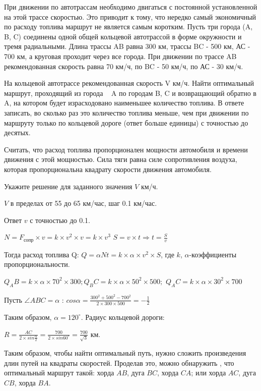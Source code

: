 
При движении по автотрассам необходимо двигаться с постоянной
установленной на этой трассе скоростью. Это приводит к тому, что нередко самый
экономичный по расходу топлива маршрут не является самым коротким.  Пусть три города (A, B, C) соединены одной общей кольцевой
автотрассой в форме окружности и тремя радиальными.  Длина трассы AB
равна 300 км, трассы BC - 500 км, АС - 700
км, а круговая проходит через все города. 
При движении по трассе AB рекомендованная
скорость равна 70 км/ч, по BC - 50 км/ч, по АС - 30 км/ч. 

На кольцевой автотрассе рекомендованная скорость V км/ч. Найти оптимальный маршрут, проходящий из города   A по городам B, C и возвращающий обратно в A, на котором будет израсходовано наименьшее количество топлива. В
ответе записать, во сколько раз это количество топлива меньше, чем при движении
по маршруту только по кольцевой дороге (ответ больше единицы) с точностью до десятых.

Считать, что
расход топлива пропорционален мощности автомобиля и времени движения с этой мощностью. Сила тяги равна силе сопротивления воздуха, которая пропорциональна квадрату скорости
движения автомобиля.

Укажите решение для заданного значения $V$ км/ч.

\paramSection

$V$ в пределах от 55 до 65 км/час, шаг 0.1 км/час. 

Ответ $v$ с точностью до 0.1.

\solutionSection

$N=F_{\text{сопр}} \times v=k \times v^2 \times v=k \times v^3$                         $S=v \times t \Rightarrow t=\frac{S}{v} $ 

Тогда расход топлива Q:   $Q=\alpha Nt=k \times \alpha  \times v^2 \times S$, где $k$, $\alpha $-коэффициенты 
пропорциональности. 

$Q_AB=k \times \alpha  \times 70^2 \times 300; Q_BC=k \times \alpha  \times 50^2 \times 500; $
$Q_AC=k \times \alpha  \times 30^2 \times 700$

Пусть $\angle ABC=\alpha$ : $cos\alpha = \frac{300^2+500^2-700^2}{2 \times 300 \times 500}=-\frac{1}{2}$

Таким образом, $\alpha =120^{\circ}$.  Радиус кольцевой дороги: 

$R=\frac{AC}{2 \times sin\frac{\alpha}{2}}= \frac{700}{2 \times sin60^{\circ}}=\frac{700}{\sqrt{3}}$  км.

Таким образом, чтобы найти оптимальный путь, нужно сложить произведения длин путей на квадраты скоростей.  
Проделав это, можно обнаружить , что оптимальный маршрут такой:  хорда $AB$, дуга $BC$, хорда $CA$;  или  хорда  
$AC$, дуга $CB$, хорда $BA$.

